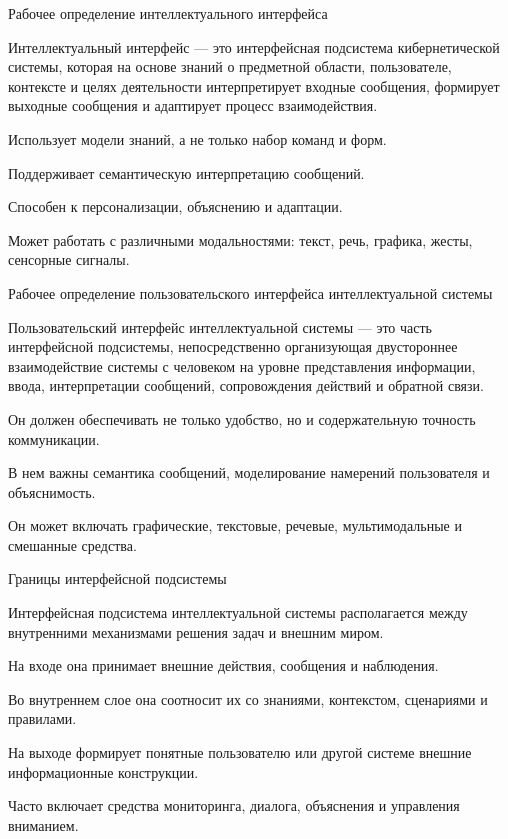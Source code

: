 \begin{frame}{Рабочее определение интеллектуального интерфейса}
	\topline
	\justifying

	
	Интеллектуальный интерфейс --- это интерфейсная подсистема кибернетической системы, которая на основе знаний о предметной области, пользователе, контексте и целях деятельности интерпретирует входные сообщения, формирует выходные сообщения и адаптирует процесс взаимодействия.
	
	\begin{textitemize}
		\item Использует модели знаний, а не только набор команд и форм.
		\item Поддерживает семантическую интерпретацию сообщений.
		\item Способен к персонализации, объяснению и адаптации.
		\item Может работать с различными модальностями: текст, речь, графика, жесты, сенсорные сигналы.
	\end{textitemize}
\end{frame}

\begin{frame}{Рабочее определение пользовательского интерфейса интеллектуальной системы}
	\topline
	\justifying

	
	Пользовательский интерфейс интеллектуальной системы --- это часть интерфейсной подсистемы, непосредственно организующая двустороннее взаимодействие системы с человеком на уровне представления информации, ввода, интерпретации сообщений, сопровождения действий и обратной связи.
	
	\begin{textitemize}
		\item Он должен обеспечивать не только удобство, но и содержательную точность коммуникации.
		\item В нем важны семантика сообщений, моделирование намерений пользователя и объяснимость.
		\item Он может включать графические, текстовые, речевые, мультимодальные и смешанные средства.
	\end{textitemize}
\end{frame}

\begin{frame}{Границы интерфейсной подсистемы}
	\topline
	\justifying

	
	Интерфейсная подсистема интеллектуальной системы располагается между внутренними механизмами решения задач и внешним миром.
	
	\begin{textitemize}
		\item На входе она принимает внешние действия, сообщения и наблюдения.
		\item Во внутреннем слое она соотносит их со знаниями, контекстом, сценариями и правилами.
		\item На выходе формирует понятные пользователю или другой системе внешние информационные конструкции.
		\item Часто включает средства мониторинга, диалога, объяснения и управления вниманием.
	\end{textitemize}
\end{frame}


